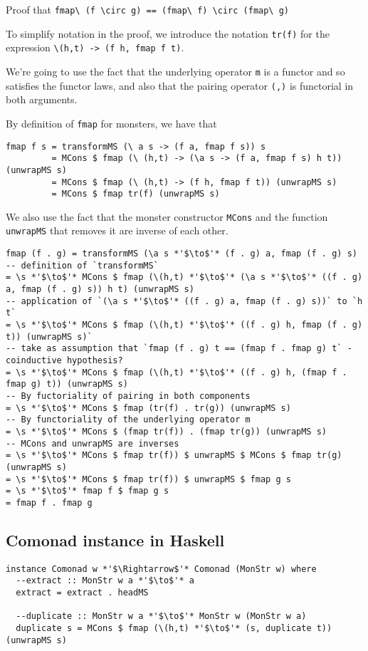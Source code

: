 \documentclass{article}
\begin{document}
Proof that \verb+fmap\ (f \circ g) == (fmap\ f) \circ (fmap\ g)+

To simplify notation in the proof, we introduce the notation \verb+tr(f)+ for the expression \verb+\(h,t) -> (f h, fmap f t)+.

We're going to use the fact that the underlying operator \verb+m+ is a functor and so satisfies the functor laws, and also that the pairing operator \verb+(,)+ is functorial in both arguments.

By definition of \verb+fmap+ for monsters, we have that
\begin{lstlisting}
fmap f s = transformMS (\ a s -> (f a, fmap f s)) s
         = MCons $ fmap (\ (h,t) -> (\a s -> (f a, fmap f s) h t)) (unwrapMS s)
         = MCons $ fmap (\ (h,t) -> (f h, fmap f t)) (unwrapMS s)
         = MCons $ fmap tr(f) (unwrapMS s)
\end{lstlisting}

We also use the fact that the monster constructor \verb+MCons+ and the function \verb+unwrapMS+ that removes it are inverse of each other.

\begin{lstlisting}
fmap (f . g) = transformMS (\a s *'$\to$'* (f . g) a, fmap (f . g) s)
-- definition of `transformMS`
= \s *'$\to$'* MCons $ fmap (\(h,t) *'$\to$'* (\a s *'$\to$'* ((f . g) a, fmap (f . g) s)) h t) (unwrapMS s)
-- application of `(\a s *'$\to$'* ((f . g) a, fmap (f . g) s))` to `h t`
= \s *'$\to$'* MCons $ fmap (\(h,t) *'$\to$'* ((f . g) h, fmap (f . g) t)) (unwrapMS s)`
-- take as assumption that `fmap (f . g) t == (fmap f . fmap g) t` - coinductive hypothesis?
= \s *'$\to$'* MCons $ fmap (\(h,t) *'$\to$'* ((f . g) h, (fmap f . fmap g) t)) (unwrapMS s)
-- By fuctoriality of pairing in both components
= \s *'$\to$'* MCons $ fmap (tr(f) . tr(g)) (unwrapMS s)
-- By functoriality of the underlying operator m
= \s *'$\to$'* MCons $ (fmap tr(f)) . (fmap tr(g)) (unwrapMS s)
-- MCons and unwrapMS are inverses
= \s *'$\to$'* MCons $ fmap tr(f)) $ unwrapMS $ MCons $ fmap tr(g) (unwrapMS s)
= \s *'$\to$'* MCons $ fmap tr(f)) $ unwrapMS $ fmap g s
= \s *'$\to$'* fmap f $ fmap g s
= fmap f . fmap g
\end{lstlisting}

\subsection{Comonad instance in Haskell}

\begin{lstlisting}
instance Comonad w *'$\Rightarrow$'* Comonad (MonStr w) where
  --extract :: MonStr w a *'$\to$'* a
  extract = extract . headMS
  
  --duplicate :: MonStr w a *'$\to$'* MonStr w (MonStr w a)
  duplicate s = MCons $ fmap (\(h,t) *'$\to$'* (s, duplicate t)) (unwrapMS s)
\end{lstlisting}
\end{document}
